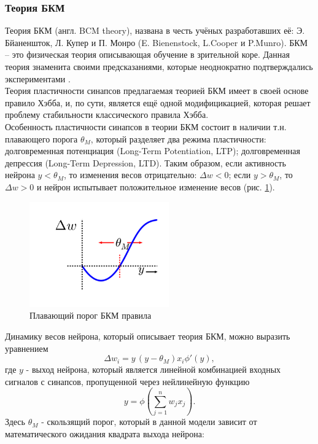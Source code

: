 \documentclass[a4paper,10pt]{article}
\begin{document}
\subsubsection{Теория БКМ}
\indent Теория БКМ (англ. BCM theory), названа в честь учёных разработавших её: Э. Бйаненшток, Л. Купер и П. Монро (E. Bienenstock, L.Cooper и P.Munro). БКМ -- это физическая теория описывающая обучение в зрительной коре. Данная теория знаменита своими предсказаниями, которые неоднократно подтверждались экспериментами \cite{Cooper}.\\
\indent Теория пластичности синапсов предлагаемая теорией БКМ имеет в своей основе правило Хэбба, и, по сути, является ещё одной модифицикацией, которая решает проблему стабильности классического правила Хэбба.\\
\indent Особенность пластичности синапсов в теории БКМ состоит в наличии т.н. плавающего порога $\theta_{M}$, который разделяет два режима пластичности: долговременная потенциация (Long-Term Potentiation, LTP); долговременная депрессия (Long-Term Depression, LTD). Таким образом, если активность нейрона $y<\theta_{M}$, то изменения весов отрицательно: $\Delta w<0$; если $y>\theta_{M}$, то $\Delta w>0$ и нейрон испытывает положительное изменение весов (рис. \ref{bcm_pic}).
\begin{figure}[ht]
\centering
\captionsetup{justification=centering,margin=1cm}
\includegraphics[width=60mm,scale=0.2]{bcm.png}
\caption{Плавающий порог БКМ правила}
\label{bcm_pic}
\end{figure}
\FloatBarrier
\indent Динамику весов нейрона, который описывает теория БКМ, можно выразить уравнением
\begin{equation*}
\Delta w_{i} = y\,(y - \theta_{M})x_{i}\phi'(y),
\end{equation*}
где $y$ - выход нейрона, который является линейной комбинацией входных сигналов с синапсов, пропущенной через нейлинейную функцию
\begin{equation*}
y = \phi(\sum_{j=1}^{n}w_{j}x_{j}).
\end{equation*}
Здесь $\theta_{M}$ - скользящий порог, который в данной модели зависит от математического ожидания квадрата выхода нейрона:
\end{document}
